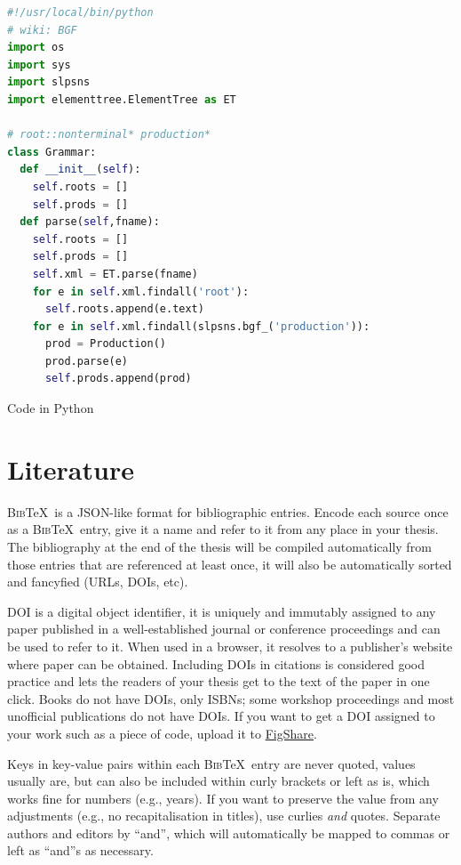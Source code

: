 \documentclass{uvamscse}
\begin{document}
\begin{sourcecode}
\begin{lstlisting}[style=mono,language=Python]
#!/usr/local/bin/python
# wiki: BGF
import os
import sys
import slpsns
import elementtree.ElementTree as ET

# root::nonterminal* production*
class Grammar:
  def __init__(self):
    self.roots = []
    self.prods = []
  def parse(self,fname):
    self.roots = []
    self.prods = []
    self.xml = ET.parse(fname)
    for e in self.xml.findall('root'):
      self.roots.append(e.text)
    for e in self.xml.findall(slpsns.bgf_('production')):
      prod = Production()
      prod.parse(e)
      self.prods.append(prod)
\end{lstlisting}
\caption{Code in Python}
\end{sourcecode}

\chapter{Literature}\label{sec:biblio}

\textsc{Bib}TeX\ is a JSON-like format for bibliographic entries. Encode each
source once as a \textsc{Bib}\TeX\ entry, give it a name and refer to it from
any place in your thesis. The bibliography at the end of the thesis will be
compiled automatically from those entries that are referenced at least once,
it will also be automatically sorted and fancyfied (URLs, DOIs, etc).

DOI is a digital object identifier, it is uniquely and immutably assigned to
any paper published in a well-established journal or conference proceedings
and can be used to refer to it. When used in a browser, it resolves to a
publisher's website where paper can be obtained. Including DOIs in citations
is considered good practice and lets the readers of your thesis get to the
text of the paper in one click. Books do not have DOIs, only ISBNs; some
workshop proceedings and most unofficial publications do not have DOIs. If you
want to get a DOI assigned to your work such as a piece of code, upload it to
\href{http://www.figshare.com}{FigShare}.

Keys in key-value pairs within each \textsc{Bib}\TeX\ entry are never quoted,
values usually are, but can also be included within curly brackets or left as
is, which works fine for numbers (e.g., years). If you want to preserve the
value from any adjustments (e.g., no recapitalisation in titles), use curlies
\emph{and} quotes. Separate authors and editors by ``and'', which will
automatically be mapped to commas or left as ``and''s as necessary.
\end{document}
